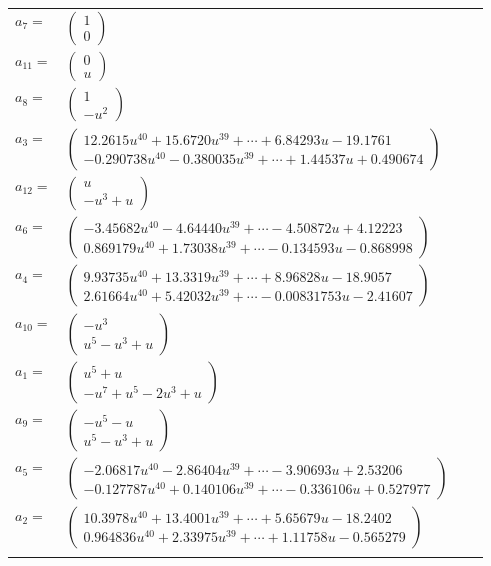 \documentclass[1p]{elsarticle_modified}
\theoremstyle{definition}
\begin{document}
\begin{tabular}{m{7pt} m{180pt} m{7pt} m{180pt} }
\flushright $a_{7}=$&$\begin{pmatrix}1\\0\end{pmatrix}$ \\
\flushright $a_{11}=$&$\begin{pmatrix}0\\u\end{pmatrix}$ \\
\flushright $a_{8}=$&$\begin{pmatrix}1\\- u^2\end{pmatrix}$ \\
\flushright $a_{3}=$&$\begin{pmatrix}12.2615 u^{40}+15.6720 u^{39}+\cdots+6.84293 u-19.1761\\-0.290738 u^{40}-0.380035 u^{39}+\cdots+1.44537 u+0.490674\end{pmatrix}$ \\
\flushright $a_{12}=$&$\begin{pmatrix}u\\- u^3+u\end{pmatrix}$ \\
\flushright $a_{6}=$&$\begin{pmatrix}-3.45682 u^{40}-4.64440 u^{39}+\cdots-4.50872 u+4.12223\\0.869179 u^{40}+1.73038 u^{39}+\cdots-0.134593 u-0.868998\end{pmatrix}$ \\
\flushright $a_{4}=$&$\begin{pmatrix}9.93735 u^{40}+13.3319 u^{39}+\cdots+8.96828 u-18.9057\\2.61664 u^{40}+5.42032 u^{39}+\cdots-0.00831753 u-2.41607\end{pmatrix}$ \\
\flushright $a_{10}=$&$\begin{pmatrix}- u^3\\u^5- u^3+u\end{pmatrix}$ \\
\flushright $a_{1}=$&$\begin{pmatrix}u^5+u\\- u^7+u^5-2 u^3+u\end{pmatrix}$ \\
\flushright $a_{9}=$&$\begin{pmatrix}- u^5- u\\u^5- u^3+u\end{pmatrix}$ \\
\flushright $a_{5}=$&$\begin{pmatrix}-2.06817 u^{40}-2.86404 u^{39}+\cdots-3.90693 u+2.53206\\-0.127787 u^{40}+0.140106 u^{39}+\cdots-0.336106 u+0.527977\end{pmatrix}$ \\
\flushright $a_{2}=$&$\begin{pmatrix}10.3978 u^{40}+13.4001 u^{39}+\cdots+5.65679 u-18.2402\\0.964836 u^{40}+2.33975 u^{39}+\cdots+1.11758 u-0.565279\end{pmatrix}$\\&\end{tabular}
\end{document}
